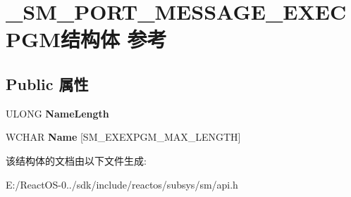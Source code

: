 \hypertarget{struct___s_m___p_o_r_t___m_e_s_s_a_g_e___e_x_e_c_p_g_m}{}\section{\+\_\+\+S\+M\+\_\+\+P\+O\+R\+T\+\_\+\+M\+E\+S\+S\+A\+G\+E\+\_\+\+E\+X\+E\+C\+P\+G\+M结构体 参考}
\label{struct___s_m___p_o_r_t___m_e_s_s_a_g_e___e_x_e_c_p_g_m}
\subsection*{Public 属性}
\begin{DoxyCompactItemize}
\item 
\mbox{\label{struct___s_m___p_o_r_t___m_e_s_s_a_g_e___e_x_e_c_p_g_m_aa2d06cff618ba35d29a2c395f2b71ce1}} 
U\+L\+O\+NG {\bfseries Name\+Length}
\item 
\mbox{\label{struct___s_m___p_o_r_t___m_e_s_s_a_g_e___e_x_e_c_p_g_m_addc823e0ad88eba7e455f3b66df4e1b3}} 
W\+C\+H\+AR {\bfseries Name} \mbox{[}S\+M\+\_\+\+E\+X\+E\+X\+P\+G\+M\+\_\+\+M\+A\+X\+\_\+\+L\+E\+N\+G\+TH\mbox{]}
\end{DoxyCompactItemize}


该结构体的文档由以下文件生成\+:\begin{DoxyCompactItemize}
\item 
E\+:/\+React\+O\+S-\/0../sdk/include/reactos/subsys/sm/api.\+h\end{DoxyCompactItemize}
